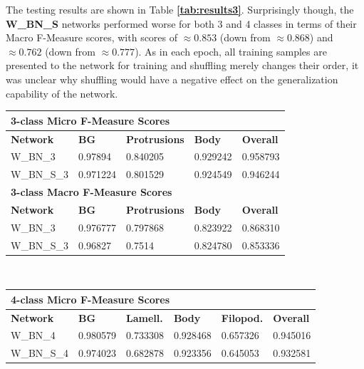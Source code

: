 The testing results are shown in Table \textbf{\ref{tab:results3}}. Surprisingly though, the \textbf{W\_BN\_S} networks performed worse for both 3 and 4 classes in terms of their Macro F-Measure scores, with scores of $\approx0.853$ (down from $\approx0.868$) and $\approx0.762$ (down from $\approx0.777$). As in each epoch, all training samples are presented to the network for training and shuffling merely changes their order, it was unclear why shuffling would have a negative effect on the generalization capability of the network.


\begin {table}
	\begin{flushleft}
		\begin {tabular}[!htb]{|l|l|l|l|l|}
			\hline\multicolumn{5}{|l|}{\textbf{3-class Micro F-Measure Scores}} \\ \hline
			\textbf{Network}& \textbf{BG}& \textbf{Protrusions}& \textbf{Body}& \textbf{Overall} \\ \hline
			W\_BN\_3& \cellcolor{green!25}0.97894& \cellcolor{green!25}0.840205& \cellcolor{green!25}0.929242& \cellcolor{green!25}0.958793 \\ \hline
			W\_BN\_S\_3& 0.971224& 0.801529& 0.924549& 0.946244 \\ \hline
			\multicolumn{5}{|l|}{\textbf{3-class Macro F-Measure Scores}} \\ \hline
			\textbf{Network}& \textbf{BG}& \textbf{Protrusions}& \textbf{Body}& \textbf{Overall} \\ \hline
			W\_BN\_3& \cellcolor{green!25}0.976777& \cellcolor{green!25}0.797868& 0.823922& \cellcolor{green!25}0.868310 \\ \hline
			W\_BN\_S\_3& 0.96827& 0.7514& \cellcolor{green!25}0.824780& 0.853336 \\ \hline
		\end {tabular}
		\vspace{0.5cm}\\
		\begin {tabular}[!htb]{|l|l|l|l|l|l|}
			\hline\multicolumn{6}{|l|}{\textbf{4-class Micro F-Measure Scores}} \\ \hline
			\textbf{Network}& \textbf{BG}& \textbf{Lamell.}& \textbf{Body}& \textbf{Filopod.}& \textbf{Overall} \\ \hline
			W\_BN\_4& \cellcolor{green!25}0.980579& \cellcolor{green!25}0.733308& \cellcolor{green!25}0.928468& \cellcolor{green!25}0.657326& \cellcolor{green!25}0.945016 \\ \hline
			W\_BN\_S\_4& 0.974023& 0.682878& 0.923356& 0.645053& 0.932581 \\ \hline

\end{tabular}
\end{flushleft}
\end{table}

